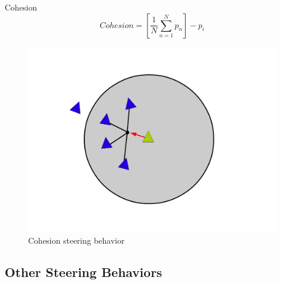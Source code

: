 \documentclass[red]{beamer}
\begin{document}
\begin{frame}{Cohesion}
	\begin{equation}
	\label{cohesionEquation}
	Cohesion = \left[  \frac{1}{N} \sum_{n=1}^{N} p_n \right ] - p_i
	\end{equation}
	
	\pause
	\begin{figure}[htbp]
	\begin{center}
	\includegraphics[scale=0.15]{../figures/cohesion.pdf}
	\caption{Cohesion steering behavior}
	\label{cohesion}
	\end{center}
	\end{figure}
\end{frame}

\subsection{Other Steering Behaviors}
\end{document}
